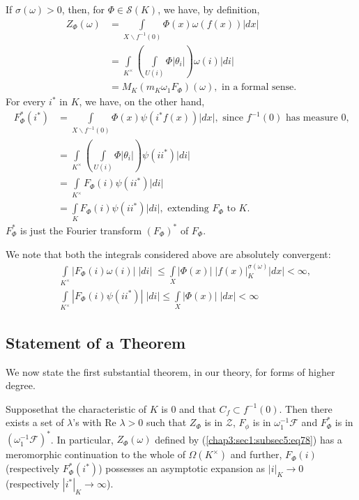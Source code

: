 If $\sigma(\omega)>0$, then, for $\Phi\in\mathscr{S}(K)$, we have, by
definition, 
\begin{align*}
Z_{\Phi}(\omega) &= \int\limits_{X\backslash
  f^{-1}(0)}\Phi(x)\omega(f(x))|dx|\tag{78}\label{chap3:sec1:subsec5:eq78}\\
&=
\int\limits_{K^{\times}}\left(\int\limits_{U(i)}\Phi|\theta_{i}|\right)\omega(i)|di|\\
&= M_{K}(m_{K}\omega_{1}F_{\Phi})(\omega), \text{ \ in a formal sense.}
\end{align*}\pageoriginale
For every $i^{\ast}$ in $K$, we have, on the other hand,
\begin{align*}
F^{\ast}_{\Phi}(i^{\ast}) &= \int\limits_{X\backslash
  f^{-1}(0)}\Phi(x)\psi(i^{\ast}f(x))|dx|,\text{ \ since \ }
f^{-1}(0)\text{ \ has measure 0,}\\
&=
\int\limits_{K^{\times}}\left(\int\limits_{U(i)}\Phi|\theta_{i}|\right)\psi(ii^{\ast})|di|\\
&= \int\limits_{K^{\times}}F_{\Phi}(i)\psi(ii^{\ast})|di|\\
&= \int\limits_{K}F_{\Phi}(i)\psi(ii^{\ast})|di|,\text{ \  extending
  \ } F_{\Phi} \text{ \  to \ } K.
\end{align*}
\ie $F^{\ast}_{\Phi}$ is just the Fourier transform
$(F_{\Phi})^{\ast}$ of $F_{\Phi}$.

We note that both the integrals considered above are absolutely
convergent:
\begin{align*}
& \int\limits_{K^{\times}}|F_{\Phi}(i)\omega(i)|\;|di|\; \leq
\int\limits_{X}|\Phi(x)|\; |f(x)|^{\sigma(\omega)}_{K}|dx|<\infty,\\
& \int\limits_{K^{\times}}|F_{\Phi}(i)\psi(ii^{\ast})|\; |di|\leq
\int\limits_{X}|\Phi(x)|\; |dx|<\infty
\end{align*}

\subsection{Statement of a Theorem}\label{chap3:sec1:subsec6} %

We now state the first substantial theorem, in our theory, for forms
of higher degree.

\setcounter{theorem}{5}
\begin{theorem}\label{chap3:sec1:subsec6:thm6} %
Suppose\pageoriginale that the characteristic of $K$ is $0$ and that
$C_{f}\subset f^{-1}(0)$. Then there exists a set of $\lambda$'s with
$\text{Re } \lambda>0$ such that $Z_{\Phi}$ is in $\mathscr{Z}$, $F_{\phi}$
is in $\omega^{-1}_{1}\mathscr{F}$ and $F^{\ast}_{\Phi}$ is in
$(\omega^{-1}_{1}\mathscr{F})^{\ast}$. In particular,
$Z_{\Phi}(\omega)$ defined by (\ref{chap3:sec1:subsec5:eq78}) has a meromorphic
continuation to the whole of $\Omega(K^{\times})$ and further,
$F_{\Phi}(i)$ (respectively $F^{\ast}_{\Phi}(i^{\ast})$) possesses an
asymptotic expansion as $|i|_{K}\to 0$ (respectively
$|i^{\ast}|_{K}\to \infty$). 
\end{theorem}

